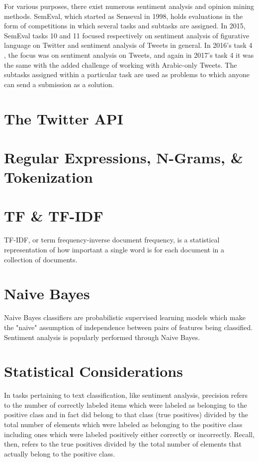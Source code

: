 \documentclass[11pt, twoside, reqno]{book}
\begin{document}
For various purposes, there exist numerous sentiment analysis and opinion mining methods. SemEval, which started as Senseval in 1998, holds evaluations in the form of competitions in which several tasks and subtasks are assigned. In 2015, SemEval tasks 10 \cite{SEMEVAL201510} and 11 \cite{SEMEVAL201511} focused respectively on sentiment analysis of figurative language on Twitter and sentiment analysis of Tweets in general. In 2016's task 4 \cite{SEMEVAL20164}, the focus was on sentiment analysis on Tweets, and again in 2017's task 4 \cite{SEMEVAL20174} it was the same with the added challenge of working with Arabic-only Tweets. The subtasks assigned within a particular task are used as problems to which anyone can send a submission as a solution. 

\section{The Twitter API}
\label{twitter_api}

\section{Regular Expressions, N-Grams, \& Tokenization}
\label{regular_expressions_etc}

\section{TF \& TF-IDF}
\label{tf_tf_idf}

TF-IDF, or term frequency-inverse document frequency, is a statistical representation of how important a single word is for each document in a collection of documents.

\section{Naive Bayes}
\label{naive_bayes}

Naive Bayes classifiers are probabilistic supervised learning models which make the "naive" assumption of independence between pairs of features being classified. Sentiment analysis is popularly performed through Naive Bayes.

\section{Statistical Considerations}
\label{statistical_considerations}

In tasks pertaining to text classification, like sentiment analysis, precision refers to the number of correctly labeled items which were labeled as belonging to the positive class and in fact did belong to that class (true positives) divided by the total number of elements which were labeled as belonging to the positive class including ones which were labeled positively either correctly or incorrectly. Recall, then, refers to the true positives divided by the total number of elements that actually belong to the positive class.
\end{document}
